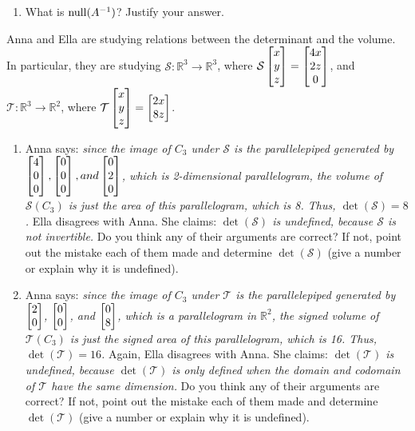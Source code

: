 \begin{exercises}
\begin{problist}
\begin{enumerate}
			\item What is $\operatorname{null}(A^{-1})$? Justify your answer.
		\end{enumerate}
\prob Anna and Ella are studying relations between the determinant and the volume. In particular, they are studying $\mathcal{S}:\mathbb{R}^3\rightarrow\mathbb{R}^3$, where $\mathcal{S}\begin{bmatrix}x \\ y \\ z\end{bmatrix}=\begin{bmatrix}4x \\ 2z \\ 0\end{bmatrix}$, and $\mathcal{T}:\mathbb{R}^3\rightarrow\mathbb{R}^2$, where $\mathcal{T}\begin{bmatrix}x \\ y \\ z\end{bmatrix}=\begin{bmatrix}2x \\ 8z\end{bmatrix}$.
\begin{enumerate}
	\item Anna says: \emph{since the image of $C_{3}$ under $\mathcal{S}$ is the
		parallelepiped generated by
		$\begin{bmatrix}4 \\ 0 \\ 0\end{bmatrix},\begin{bmatrix}0 \\ 0 \\ 0\end{bmatrix}, and \begin{bmatrix}0 \\ 2 \\ 0\end{bmatrix}$, which is
		2-dimensional parallelogram, the volume of $\mathcal{S}(C_{3})$ is just
		the area of this parallelogram, which is 8. Thus, $\det(\mathcal{S})=8$.}
		Ella disagrees with Anna. She claims: \emph{$\det(\mathcal{S})$ is
		undefined, because $\mathcal{S}$ is not invertible.} Do you think any of
		their arguments are correct? If not, point out the mistake each of them made
		and determine $\det(\mathcal{S})$ (give a number or explain why it is
		undefined).

	\item Anna says: \emph{since the image of $C_{3}$ under $\mathcal{T}$ is the
		parallelepiped generated by $\begin{bmatrix}2 \\ 0\end{bmatrix}$, $\begin{bmatrix}0 \\ 0\end{bmatrix}$, and
		$\begin{bmatrix}0 \\ 8\end{bmatrix}$, which is a parallelogram in $\mathbb{R}^{2}$, the
		signed volume of $\mathcal{T}(C_{3})$ is just the signed area of this
		parallelogram, which is 16. Thus, $\det(\mathcal{T})=16$.} Again, Ella disagrees
		with Anna. She claims: \emph{$\det(\mathcal{T})$ is undefined, because
		$\det(\mathcal{T})$ is only defined when the domain and codomain of
		$\mathcal{T}$ have the same dimension.} Do you think any of their
		arguments are correct? If not, point out the mistake each of them made
		and determine $\det(\mathcal{T})$ (give a number or explain why it is undefined).
\end{enumerate}
	\end{problist}
\end{exercises}

